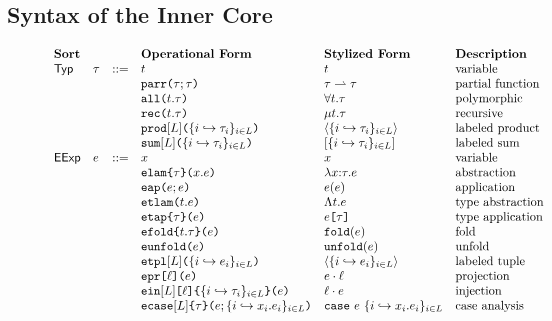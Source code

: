 \subsection{Syntax of the Inner Core}\label{sec:U-expanded-terms}

\begin{figure}
\hspace{-5px}$\begin{array}{lllllll}
\textbf{Sort} & & & \textbf{Operational Form} & \textbf{Stylized Form} & \textbf{Description}\\
\mathsf{Typ} & \tau & ::= & t & t & \text{variable}\\
&&& \texttt{parr}\texttt{(}\tau; \tau\texttt{)} & \tau \rightharpoonup \tau & \text{partial function}\\
&&& \texttt{all}\texttt{(}t.\tau\texttt{)} & \forall t.\tau & \text{polymorphic}\\
&&& \texttt{rec}\texttt{(}t.\tau\texttt{)} & \mu t.\tau & \text{recursive}\\
&&& \texttt{prod}[L]\texttt{(}\{i \hookrightarrow \tau_{i}\}_{i \in L}\texttt{)} & \langle \{i \hookrightarrow \tau_{i}\}_{i \in L} \rangle & \text{labeled product}\\
&&& \texttt{sum}[L]\texttt{(}\{i \hookrightarrow \tau_{i}\}_{i \in L}\texttt{)} & [\{i \hookrightarrow \tau_{i}\}_{i \in L}] & \text{labeled sum}\\
\mathsf{EExp} & e & ::= & x & x & \text{variable}\\
&&& \texttt{elam}\texttt{\{}\tau\texttt{\}(}x.e\texttt{)} & \lambda x{:}\tau.e & \text{abstraction}\\
&&& \texttt{eap}\texttt{(}e; e\texttt{)} & e(e) & \text{application}\\
&&& \texttt{etlam}\texttt{(}t.e\texttt{)} & \Lambda t.e & \text{type abstraction}\\
&&& \texttt{etap}\texttt{\{}\tau\texttt{\}(}e\texttt{)} & e\texttt{[}\tau\texttt{]} & \text{type application}\\
&&& \texttt{efold}\texttt{\{}t.\tau\texttt{\}(}e\texttt{)} & \texttt{fold}(e) & \text{fold}\\
&&& \texttt{eunfold}\texttt{(}e\texttt{)} & \texttt{unfold}(e) & \text{unfold}\\
&&& \texttt{etpl}[L]\texttt{(}\{i \hookrightarrow e_{i}\}_{i \in L}\texttt{)} & \langle \{i \hookrightarrow e_{i}\}_{i \in L}\rangle & \text{labeled tuple}\\
&&& \texttt{epr}\texttt{[}\ell\texttt{](}e\texttt{)} & e \cdot \ell & \text{projection}\\
&&& \texttt{ein}[L]\texttt{[}\ell\texttt{]\{}\{i \hookrightarrow \tau_{i}\}_{i \in L}\texttt{\}(}e\texttt{)} & \ell \cdot e & \text{injection}\\
&&& \texttt{ecase}[L]\texttt{\{}\tau\texttt{\}(}e; \{i \hookrightarrow x_{i}.e_{i}\}_{i \in L}\texttt{)} & \texttt{case}~e~\{i \hookrightarrow x_{i}.e_{i}\}_{i \in L} & \text{case analysis}
\end{array}$

\end{figure}
